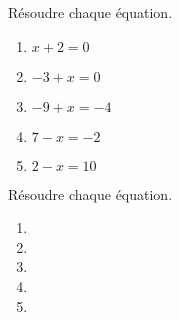 \begin{exercice*}
    Résoudre chaque équation.
    \begin{multicols}{2}
        \begin{enumerate}
            \item $x+2=0$
            \item $-3+x=0$
            \item $-9+x=-4$
            \item $7-x=-2$
            \item $2-x=10$
        \end{enumerate}
    \end{multicols}
\end{exercice*}
\begin{corrige}
    Résoudre chaque équation.
    \begin{multicols}{2}
        \begin{enumerate}
            \item {}
            \item {}
            \item {}
            \item {}
            \item {}
        \end{enumerate}
    \end{multicols}    
\end{corrige}

